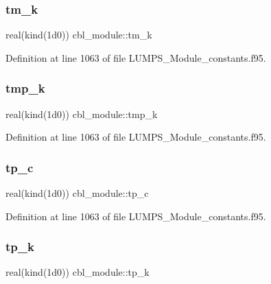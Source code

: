 \subsubsection{\texorpdfstring{tm\+\_\+k}{tm\_k}}
{\footnotesize\ttfamily real(kind(1d0)) cbl\+\_\+module\+::tm\+\_\+k}



Definition at line 1063 of file L\+U\+M\+P\+S\+\_\+\+Module\+\_\+constants.\+f95.

\mbox{\label{namespacecbl__module_a8cbccf2c4274c8e254bdd331947d39b8}} 
\subsubsection{\texorpdfstring{tmp\+\_\+k}{tmp\_k}}
{\footnotesize\ttfamily real(kind(1d0)) cbl\+\_\+module\+::tmp\+\_\+k}



Definition at line 1063 of file L\+U\+M\+P\+S\+\_\+\+Module\+\_\+constants.\+f95.

\mbox{\label{namespacecbl__module_a7b92d87a613cb13145b7c84beced7f67}} 
\subsubsection{\texorpdfstring{tp\+\_\+c}{tp\_c}}
{\footnotesize\ttfamily real(kind(1d0)) cbl\+\_\+module\+::tp\+\_\+c}



Definition at line 1063 of file L\+U\+M\+P\+S\+\_\+\+Module\+\_\+constants.\+f95.

\mbox{\label{namespacecbl__module_af9b1b9c8cf1a15dca9b8750920a048c3}} 
\subsubsection{\texorpdfstring{tp\+\_\+k}{tp\_k}}
{\footnotesize\ttfamily real(kind(1d0)) cbl\+\_\+module\+::tp\+\_\+k}



